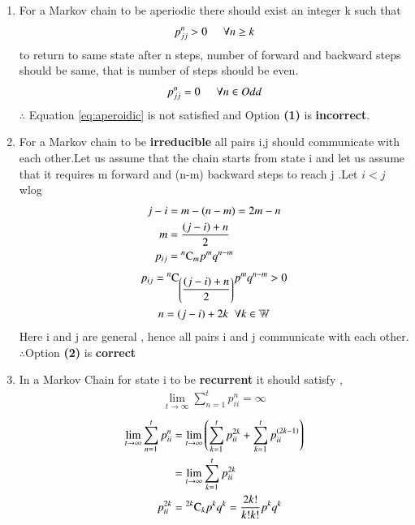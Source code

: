 \documentclass[journal,12pt,twocolumn]{IEEEtran}
\begin{document}
\begin{enumerate}
\item For a Markov chain to be aperiodic there should exist an integer k such that
\begin{align}
p^n_{jj} > 0 \hspace{0.5cm} \forall n \geq k \label{eq:aperoidic}
\end{align} 
to return to same state after n steps, number of forward and backward steps should be same, that is number of steps should be even. 
\begin{align}
p^n_{jj} = 0 \hspace{0.5cm} \forall n \in Odd \label{eq:1}
\end{align}
$\therefore$ Equation \eqref{eq:aperoidic} is not satisfied and Option \textbf{(1)} is \textbf{incorrect}.
\item For a Markov chain to be \textbf{irreducible} all pairs i,j should communicate with each other.Let us assume that the chain starts from state i and let us assume that it requires m forward and (n-m) backward steps to reach j .Let $i < j$ wlog 
\begin{align}
j - i &= m - (n - m) = 2m - n\\
m &= \frac{(j - i) + n}{2}\\
p_{ij} &= {}^{n}\mathrm{C}_{m} p^m q^{n-m}
\end{align}
\begin{multline}
p_{ij} = {}^{n}\mathrm{C}_{\left(\dfrac{(j - i) + n}{2}\right)} p^m q^{n-m} > 0\\
 n = (j-i)+2k \hspace{0.2cm} \forall k \in \mathbb{W}
\end{multline}
Here i and j are general , hence all pairs i and j communicate with each other.\\
$\therefore$Option \textbf{(2)} is \textbf{correct}
\item In a Markov Chain for state i to be \textbf{recurrent} it should satisfy ,
\begin{align}
\lim_{t \to \infty} \sum_{n=1}^{t} p^n_{ii} = \infty \label{eq:Recurrent}
\end{align}
\begin{align}
\lim_{t \to \infty} \sum_{n=1}^{t} p^n_{ii} &= \lim_{t \to \infty}\left(\sum_{k=1}^{t} p^{2k}_{ii} + \sum_{k=1}^{t} p^{(2k-1)}_{ii}\right)\\
&= \lim_{t \to \infty}\sum_{k=1}^{t} p^{2k}_{ii}\\
p^{2k}_{ii} &= {}^{2k}\mathrm{C}_{k}p^kq^k  = \frac{2k !}{k!k!}p^kq^k \label{eq:2}
\end{align}

\end{enumerate}
\end{document}
